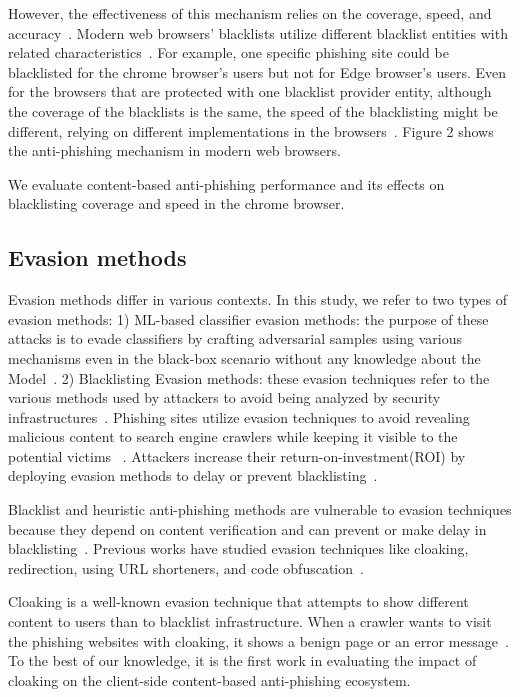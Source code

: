 However, the effectiveness of this mechanism relies on the coverage, speed, and accuracy~\cite{sheng2009empirical}. Modern web browsers' blacklists utilize different blacklist entities with related characteristics~\cite{bell2020analysis}. For example, one specific phishing site could be blacklisted for the chrome browser's users but not for Edge browser's users.
Even for the browsers that are protected with one blacklist provider entity, although the coverage of the blacklists is the same, the speed of the blacklisting might be different, relying on different implementations in the browsers~\cite{oest2019phishfarm}.
Figure 2 shows the anti-phishing mechanism in modern web browsers. 

We evaluate content-based anti-phishing performance and its effects on blacklisting coverage and speed in the chrome browser.

\subsection{Evasion methods}
Evasion methods differ in various contexts. In this study, we refer to two types of evasion methods:
1) ML-based classifier evasion methods: the purpose of these attacks is to evade classifiers by crafting adversarial samples using various mechanisms even in the black-box scenario without any knowledge about the Model~\cite{anderson2019adversarial}. 
2) Blacklisting Evasion methods: these evasion techniques refer to the various methods used by attackers to avoid being analyzed by security infrastructures~\cite{egele2008survey}.
Phishing sites utilize evasion techniques to avoid revealing malicious content to search engine crawlers while keeping it visible to the potential victims ~\cite{samarasinghe2020cloaking, invernizzi2016cloak,panum2020towards}. 
Attackers increase their return-on-investment(ROI) by deploying evasion methods to delay or prevent blacklisting~\cite{han2016phisheye,nero2011phishing,oest2019phishfarm}. 

Blacklist and heuristic anti-phishing methods are vulnerable to evasion techniques because they depend on content verification and can prevent or make delay in blacklisting~\cite{oest2019phishfarm}.
Previous works have studied evasion techniques like cloaking, redirection, using URL shorteners, and code obfuscation~\cite{fette2007learning,cova2008there,chhabra2011phi}.

Cloaking is a well-known evasion technique that attempts to show different content to users than to blacklist infrastructure. When a crawler wants to visit the phishing websites with cloaking, it shows a benign page or an error message~\cite{invernizzi2016cloak}.
To the best of our knowledge, it is the first work in evaluating the impact of cloaking on the client-side content-based anti-phishing ecosystem.

